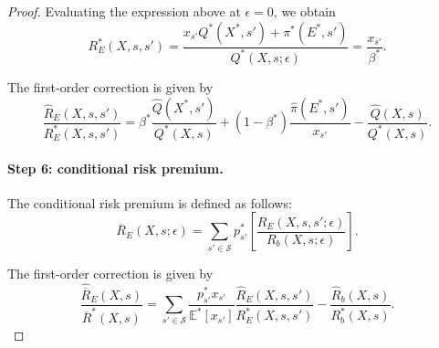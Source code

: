 \begin{proof}
Evaluating the expression above at $\epsilon = 0$, we obtain
\begin{equation}
    R_E^*(X,s,s') = \frac{x_{s'} Q^*(X^*, s') + \pi^*(E^*, s') }{Q^*(X,s;\epsilon)} = \frac{x_{s'}}{\beta^*}.
\end{equation}

The first-order correction is given by 
\begin{equation}
    \frac{\hat{R}_E(X,s,s')}{R^*_E(X,s,s')} = \beta^* \frac{\hat{Q}(X^*,s')}{Q^*(X,s)} +(1-\beta^*) \frac{\hat{\pi}(E^*, s')}{x_{s'}} - \frac{\hat{Q}(X,s)}{Q^*(X,s)}.
\end{equation}

\paragraph{Step 6: conditional risk premium.} The conditional risk premium is defined as follows:
\begin{equation}
    \overline{R}_E(X,s;\epsilon) = \sum_{s'\in \mathcal{S}} p_{s'}^*\left[ \frac{R_E(X,s,s';\epsilon)}{R_b(X,s;\epsilon)}\right].
\end{equation}

The first-order correction is given by
\begin{equation}
    \frac{\widehat{\overline{R}}_E(X,s)}{\overline{R}^*(X,s)} = \sum_{s'\in \mathcal{S}} \frac{p_{s'}^* x_{s'}}{\mathbb{E}^*[x_{s'}]} \frac{\hat{R}_E(X,s,s')}{R_E^*(X,s,s')} -\frac{\hat{R}_b(X,s)}{R^*_b(X,s)}.
\end{equation}


\end{proof}

